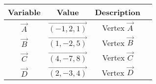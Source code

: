     \begin{tabular}{|c|c|c|c|}
        \hline
        Variable & Value         & Description              \\
        \hline
        $\vec{A}$      & $\vec{(-1, 2, 1)}$  & Vertex $\vec{A}$                 \\
        $\vec{B}$      & $\vec{(1, -2, 5)}$  & Vertex $\vec{B}$                  \\
        $\vec{C}$      & $\vec{(4, -7, 8)}$  & Vertex $\vec{C}$               \\
        $\vec{D}$      & $\vec{(2, -3, 4)}$  & Vertex $\vec{D}$                 \\
        \hline
    \end{tabular}